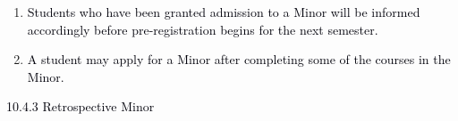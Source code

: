 \documentclass[12pt]{article}
\begin{document}
\vspace{\baselineskip}
\begin{enumerate}
	\item {\fontsize{10pt}{12.0pt}\selectfont \textcolor[HTML]{00000A}{Students who have been granted admission to a Minor will be informed accordingly before pre-registration begins for the next semester.}\par}\par


\vspace{\baselineskip}
	\item {\fontsize{10pt}{12.0pt}\selectfont \textcolor[HTML]{00000A}{A student may apply for a Minor after completing some of the courses in the Minor.}\par}
\end{enumerate}\par


\vspace{\baselineskip}
{\fontsize{10pt}{12.0pt}\selectfont \textcolor[HTML]{00000A}{10.4.3 Retrospective Minor}\par}\par
\end{document}
